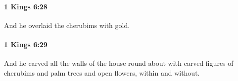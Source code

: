 		\paragraph{1 Kings 6:28} %
			\label{1KINGS-6-28}

			And he overlaid the cherubims with gold.


		\paragraph{1 Kings 6:29} %
			\label{1KINGS-6-29}

			And he carved all the walls of the house round about with carved figures of cherubims and palm trees and open flowers, within and without.


